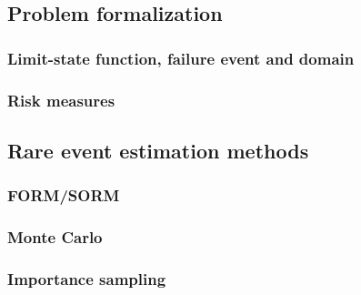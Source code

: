 \subsection{Problem formalization}

\subsubsection{Limit-state function, failure event and domain}

\subsubsection{Risk measures }


\subsection{Rare event estimation methods}

\subsubsection{FORM/SORM}

\subsubsection{Monte Carlo}

\subsubsection{Importance sampling}

